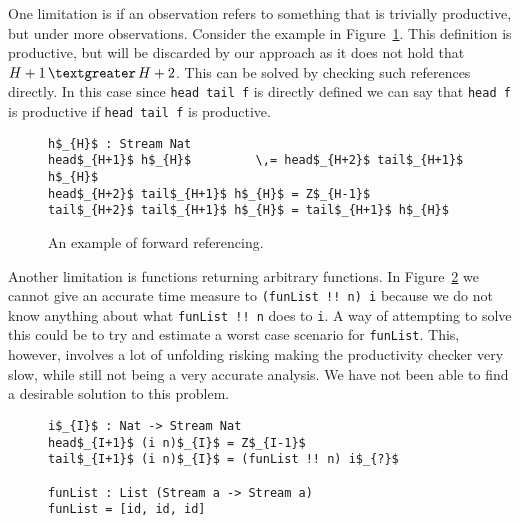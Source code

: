 One limitation is if an observation refers to something that is trivially productive, but under more observations. Consider the example in Figure~\ref{fig:forwardRef}. This definition is productive, but will be discarded by our approach as it does not hold that $H+1\,\textgreater\,H+2$. This can be solved by checking such references directly. In this case since \texttt{head tail f} is directly defined we can say that \texttt{head f} is productive if \texttt{head tail f} is productive.

\begin{figure}
\begin{Verbatim}[commandchars=\\\{\},codes={\catcode`$=3\catcode`_=8}]
h$_{H}$ : Stream Nat
head$_{H+1}$ h$_{H}$         \,= head$_{H+2}$ tail$_{H+1}$ h$_{H}$
head$_{H+2}$ tail$_{H+1}$ h$_{H}$ = Z$_{H-1}$
tail$_{H+2}$ tail$_{H+1}$ h$_{H}$ = tail$_{H+1}$ h$_{H}$
\end{Verbatim}
\caption{An example of forward referencing.}
\label{fig:forwardRef}
\end{figure}

Another limitation is functions returning arbitrary functions. In Figure~\ref{fig:funList} we cannot give an accurate time measure to \texttt{(funList !! n) i} because we do not know anything about what \texttt{funList !! n} does to \texttt{i}. A way of attempting to solve this could be to try and estimate a worst case scenario for \texttt{funList}. This, however, involves a lot of unfolding risking making the productivity checker very slow, while still not being a very accurate analysis. We have not been able to find a desirable solution to this problem.

\begin{figure}
\begin{Verbatim}[commandchars=\\\{\},codes={\catcode`$=3\catcode`_=8}]
i$_{I}$ : Nat -> Stream Nat
head$_{I+1}$ (i n)$_{I}$ = Z$_{I-1}$
tail$_{I+1}$ (i n)$_{I}$ = (funList !! n) i$_{?}$

funList : List (Stream a -> Stream a)
funList = [id, id, id]
\end{Verbatim}
\caption{}
\label{fig:funList}
\end{figure}